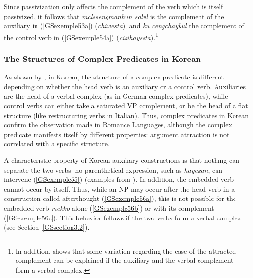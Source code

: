 \documentclass[output=paper
                ,modfonts
                ,nonflat
	        ,collection
	        ,collectionchapter
	        ,collectiontoclongg
 	        ,biblatex
                ,babelshorthands
                ,newtxmath
                ,draftmode
                ,colorlinks, citecolor=brown
]{./langsci/langscibook}
\begin{document}
{\eal
	\label{GSexemple54} 
	\label{GSexemple54a}
		
	\label{GSexemple54b}
\zl

Since passivization only affects the complement of the verb which is itself passivized, it follows that \emph{malssengmanhun solul} is the complement of the auxiliary in (\ref{GSexemple53a}) (\emph{chiwesta}), and \emph{ku cengchaykul} the complement of the control verb in (\ref{GSexemple54a}) (\emph{cisihayssta}).\footnote{In addition, \cite{Yoo2003} shows that some variation regarding the case of the attracted complement can be explained if the auxiliary and the verbal complement form a verbal complex.}

\subsubsection{The Structures of Complex Predicates in Korean}\label{GSsection4.2.2}
 
As shown by \cite{Chung98a-u}, in Korean, the structure of a complex predicate is different depending on whether the head verb is an auxiliary or a control verb. Auxiliaries are the head of a verbal complex (as in German complex predicates), while control verbs can either take a saturated VP complement, or be the head of a flat structure (like restructuring verbs in Italian). Thus, complex predicates in Korean confirm the observation made in Romance Languages, although the complex predicate manifests itself by different properties: argument attraction is not correlated with a specific structure. 

A characteristic property of Korean auxiliary constructions is that nothing can separate the two verbs: no parenthetical expression, such as \emph{hayekan}, can intervene (\ref{GSexemple55}) (examples from \citealt{Chung98a-u}). In addition, the embedded verb cannot occur by itself. Thus, while an NP may occur after the head verb in a construction called afterthought (\ref{GSexemple56a}), this is not possible for the embedded verb \emph{mekko} alone (\ref{GSexemple56b}) or with its complement (\ref{GSexemple56c}). This behavior follows if the two verbs form a verbal complex (see Section~\ref{GSsection3.2}).

}
\end{document}
